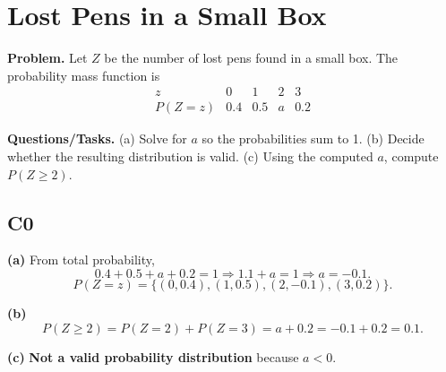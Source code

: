 		\section{Lost Pens in a Small Box}
		
		\textbf{Problem.}
		Let $Z$ be the number of lost pens found in a small box. The probability mass function is
		\[
		\begin{array}{c|cccc}
			z & 0 & 1 & 2 & 3\\
			\hline
			P(Z=z) & 0.4 & 0.5 & a & 0.2
		\end{array}
		\]
		
		\textbf{Questions/Tasks.}
		(a) Solve for $a$ so the probabilities sum to 1.
		(b) Decide whether the resulting distribution is valid.
		(c) Using the computed $a$, compute $P(Z\ge 2)$.
		
		\subsection*{C0}

		\textbf{(a)} From total probability,
		\[
		0.4+0.5+a+0.2=1\Rightarrow 1.1+a=1\Rightarrow a=-0.1.
		\]
		\[
		P(Z=z)=\{(0,0.4),(1,0.5),(2,-0.1),(3,0.2)\}.
		\]
		\begin{center}
		\end{center}
		

		\textbf{(b)}
		\[
		P(Z\ge 2)=P(Z=2)+P(Z=3)=a+0.2=-0.1+0.2=0.1.
		\]
		\begin{center}
		\end{center}
		\textbf{(c)} \textbf{Not a valid probability distribution} because $a<0$.

